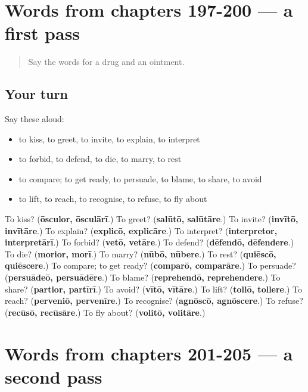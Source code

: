 \section[(dialogue)]{Words from chapters 197-200 — a first pass}

\label{lesson:LA-R205-first-pass-words-from-chapters-197-200}



\begin{quote}
Say the words for a drug and an ointment.
\end{quote}

\subsection*{Your turn}
Say these aloud:

\begin{itemize}
\raggedright
  \item to kiss, to greet, to invite, to explain, to interpret
  \item to forbid, to defend, to die, to marry, to rest
  \item to compare; to get ready, to persuade, to blame, to share, to avoid
  \item to lift, to reach, to recognise, to refuse, to fly about
\end{itemize}

\begin{tcolorbox}[breakable,colback=teal!4,colframe=teal!35!black,title={Before you move on}]
To kiss? (\textbf{ōsculor, ōsculārī}.) To greet? (\textbf{salūtō, salūtāre}.) To invite? (\textbf{invītō, invītāre}.) To explain? (\textbf{explicō, explicāre}.) To interpret? (\textbf{interpretor, interpretārī}.) To forbid? (\textbf{vetō, vetāre}.) To defend? (\textbf{dēfendō, dēfendere}.) To die? (\textbf{morior, morī}.) To marry? (\textbf{nūbō, nūbere}.) To rest? (\textbf{quiēscō, quiēscere}.) To compare; to get ready? (\textbf{comparō, comparāre}.) To persuade? (\textbf{persuādeō, persuādēre}.) To blame? (\textbf{reprehendō, reprehendere}.) To share? (\textbf{partior, partīrī}.) To avoid? (\textbf{vītō, vītāre}.) To lift? (\textbf{tollō, tollere}.) To reach? (\textbf{perveniō, pervenīre}.) To recognise? (\textbf{agnōscō, agnōscere}.) To refuse? (\textbf{recūsō, recūsāre}.) To fly about? (\textbf{volitō, volitāre}.)
\end{tcolorbox}
\section[(dialogue)]{Words from chapters 201-205 — a second pass}

